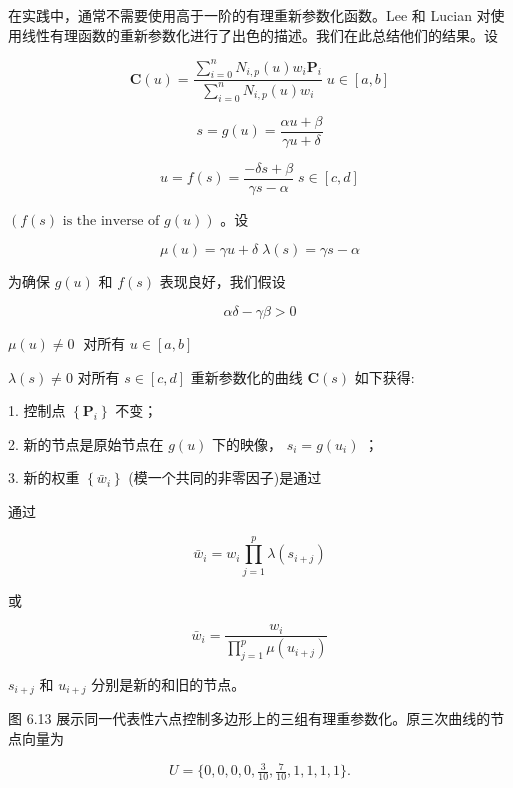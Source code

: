 \documentclass[../main.tex]{subfiles}
\begin{document}
在实践中，通常不需要使用高于一阶的有理重新参数化函数。Lee 和 Lucian \cite{Lee91} 对使用线性有理函数的重新参数化进行了出色的描述。我们在此总结他们的结果。设

\[
\mathbf{C}\left( u\right)  = \frac{\mathop{\sum }\limits_{{i = 0}}^{n}{N}_{i,p}\left( u\right) {w}_{i}{\mathbf{P}}_{i}}{\mathop{\sum }\limits_{{i = 0}}^{n}{N}_{i,p}\left( u\right) {w}_{i}}\;u \in  \left\lbrack  {a,b}\right\rbrack
\]

\[
s = g\left( u\right)  = \frac{{\alpha u} + \beta }{{\gamma u} + \delta }
\]

\[
u = f\left( s\right)  = \frac{-{\delta s} + \beta }{{\gamma s} - \alpha }\;s \in  \left\lbrack  {c,d}\right\rbrack
\]

\(\left( {f\left( s\right) \text{ is the inverse of }g\left( u\right) }\right)\) 。设

\[
\mu \left( u\right)  = {\gamma u} + \delta \;\lambda \left( s\right)  = {\gamma s} - \alpha
\]

为确保 \(g\left( u\right)\) 和 \(f\left( s\right)\) 表现良好，我们假设

\[
{\alpha \delta } - {\gamma \beta } > 0
\]

\(\mu \left( u\right)  \neq  0\;\) 对所有 \(u \in  \left\lbrack  {a,b}\right\rbrack\)

\(\lambda \left( s\right)  \neq  0\) 对所有 \(s \in  \left\lbrack  {c,d}\right\rbrack\) 重新参数化的曲线 \(\mathbf{C}\left( s\right)\) 如下获得:



1. 控制点 \(\left\{  {\mathbf{P}}_{i}\right\}\) 不变；

2. 新的节点是原始节点在 \(g\left( u\right)\) 下的映像， \({s}_{i} = g\left( {u}_{i}\right)\) ；

3. 新的权重 \(\left\{  {\bar{w}}_{i}\right\}\) (模一个共同的非零因子)是通过

通过

\[
{\bar{w}}_{i} = {w}_{i}\mathop{\prod }\limits_{{j = 1}}^{p}\lambda \left( {s}_{i + j}\right)  \tag{6.56}
\]

或

\[
{\bar{w}}_{i} = \frac{{w}_{i}}{\mathop{\prod }\limits_{{j = 1}}^{p}\mu \left( {u}_{i + j}\right) } \tag{6.57}
\]

\({s}_{i + j}\) 和 \({u}_{i + j}\) 分别是新的和旧的节点。

图 6.13 展示同一代表性六点控制多边形上的三组有理重参数化。原三次曲线的节点向量为

\[
U=\{0,0,0,0,\tfrac3{10},\tfrac7{10},1,1,1,1\}.
\]
\end{document}
